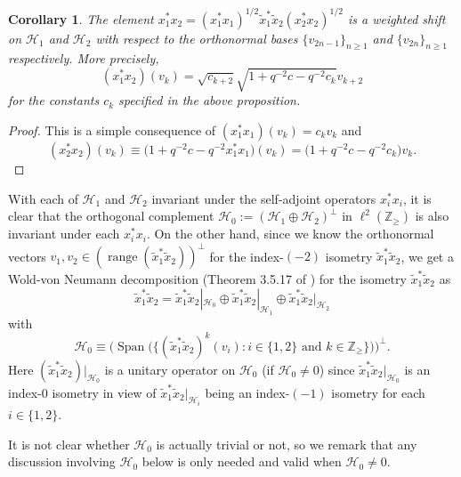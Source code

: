 \documentclass[11pt]{article}
\numberwithin{equation}{section}
\newtheorem{corollary}{Corollary}
\begin{document}
\begin{corollary}\label{weight_shift} The element $x_{1}^{\ast}x_{2}=( x_{1}^{\ast}x_{1})
^{1/2}\tilde{x}_{1}^{\ast}\tilde{x}_{2}( x_{2}^{\ast}x_{2})
^{1/2}$ is a weighted shift on $\mathcal{H}_{1}$ and $\mathcal{H}_{2}$ with
respect to the orthonormal bases $\{ v_{2n-1}\} _{n\geq1}$ and
$\{ v_{2n}\} _{n\geq1}$ respectively. More precisely,
\[
( x_{1}^{\ast}x_{2}) ( v_{k}) =\sqrt{c_{k+2}}%
\sqrt{1+q^{-2}c-q^{-2}c_{k}}v_{k+2}%
\]
for the constants $c_{k}$ specified in the above proposition.
\end{corollary}
\begin{proof} This is a simple consequence of $( x_{1}^{\ast}x_{1})
( v_{k}) =c_{k}v_{k}$ and
\[
( x_{2}^{\ast}x_{2}) ( v_{k}) \equiv\big(
1+q^{-2}c-q^{-2}x_{1}^{\ast}x_{1}\big) ( v_{k}) =\big(
1+q^{-2}c-q^{-2}c_{k}\big) v_{k} .\tag*{\qed}
\]\renewcommand{\qed}{}
\end{proof}

With each of $\mathcal{H}_{1}$ and $\mathcal{H}_{2}$ invariant under the
self-adjoint operators $x_{i}^{\ast}x_{i}$, it is clear that the orthogonal
complement $\mathcal{H}_{0}:=( \mathcal{H}_{1}\oplus\mathcal{H}%
_{2}) ^{\perp}$ in $\ell^{2}( \mathbb{Z}_{\geq}) $ is also
invariant under each $x_{i}^{\ast}x_{i}$. On the other hand, since we know the
orthonormal vectors $v_{1},v_{2}\in( \operatorname{range}(
\tilde{x}_{1}^{\ast}\tilde{x}_{2}) ) ^{\perp}$ for the
index-$( -2) $ isometry $\tilde{x}_{1}^{\ast}\tilde{x}_{2}$, we
get a Wold-von Neumann decomposition (Theorem 3.5.17 of \cite{Mu}) for the
isometry $\tilde{x}_{1}^{\ast}\tilde{x}_{2}$ as
\[
\tilde{x}_{1}^{\ast}\tilde{x}_{2}=\tilde{x}_{1}^{\ast}\tilde{x}_{2}%
|_{\mathcal{H}_{0}}\oplus\tilde{x}_{1}^{\ast}\tilde{x}_{2}|_{\mathcal{H}_{1}%
}\oplus\tilde{x}_{1}^{\ast}\tilde{x}_{2}|_{\mathcal{H}_{2}}%
\]
with
\[
\mathcal{H}_{0}\equiv\big( \operatorname{Span}\big( \big\{ (
\tilde{x}_{1}^{\ast}\tilde{x}_{2}) ^{k}( v_{i})
\colon i\in\{ 1,2\} \text{ and }k\in\mathbb{Z}_{\geq}\big\} \big)
\big) ^{\perp} .
\]
Here $( \tilde{x}_{1}^{\ast}\tilde{x}_{2}) |_{\mathcal{H}_{0}}$
is a unitary operator on $\mathcal{H}_{0}$ (if $\mathcal{H}_{0}\neq0$) since
$\tilde{x}_{1}^{\ast}\tilde{x}_{2}|_{\mathcal{H}_{0}}$ is an index-$0$
isometry in view of $\tilde{x}_{1}^{\ast}\tilde{x}_{2}|_{\mathcal{H}_{i}}$
being an index-$( -1) $ isometry for each $i\in\{
1,2\} $.

It is not clear whether $\mathcal{H}_{0}$ is actually trivial or not, so we
remark that any discussion involving $\mathcal{H}_{0}$ below is only needed
and valid when $\mathcal{H}_{0}\neq0$.
\end{document}
